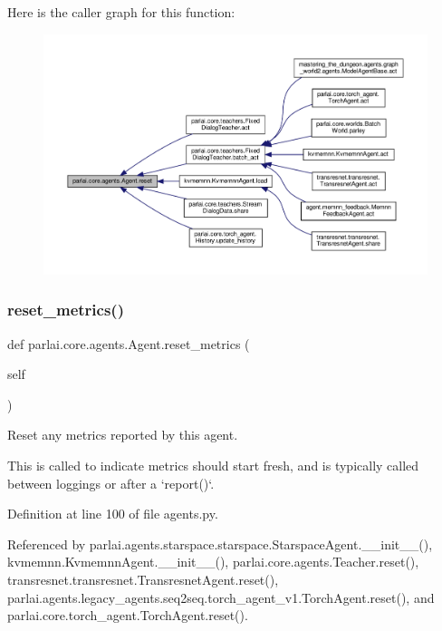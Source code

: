 Here is the caller graph for this function\+:
\nopagebreak
\begin{figure}[H]
\begin{center}
\leavevmode
\includegraphics[width=350pt]{classparlai_1_1core_1_1agents_1_1Agent_a27cb8206372681605b00dc28b81a7c39_icgraph}
\end{center}
\end{figure}
\mbox{\label{classparlai_1_1core_1_1agents_1_1Agent_aaefcbd7c61d319b368b3ee13997c8c99}} 
\subsubsection{\texorpdfstring{reset\+\_\+metrics()}{reset\_metrics()}}
{\footnotesize\ttfamily def parlai.\+core.\+agents.\+Agent.\+reset\+\_\+metrics (\begin{DoxyParamCaption}\item[{}]{self }\end{DoxyParamCaption})}

\begin{DoxyVerb}Reset any metrics reported by this agent.

This is called to indicate metrics should start fresh, and is typically
called between loggings or after a `report()`.
\end{DoxyVerb}
 

Definition at line 100 of file agents.\+py.



Referenced by parlai.\+agents.\+starspace.\+starspace.\+Starspace\+Agent.\+\_\+\+\_\+init\+\_\+\+\_\+(), kvmemnn.\+Kvmemnn\+Agent.\+\_\+\+\_\+init\+\_\+\+\_\+(), parlai.\+core.\+agents.\+Teacher.\+reset(), transresnet.\+transresnet.\+Transresnet\+Agent.\+reset(), parlai.\+agents.\+legacy\+\_\+agents.\+seq2seq.\+torch\+\_\+agent\+\_\+v1.\+Torch\+Agent.\+reset(), and parlai.\+core.\+torch\+\_\+agent.\+Torch\+Agent.\+reset().

